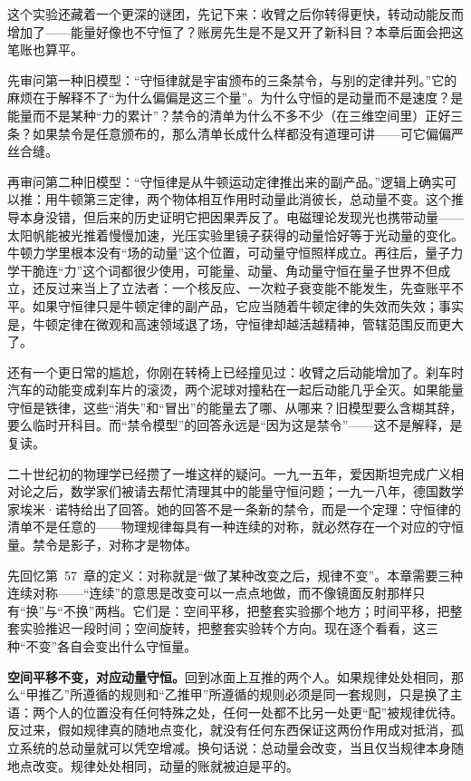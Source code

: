 这个实验还藏着一个更深的谜团，先记下来：收臂之后你转得更快，转动动能反而增加了——能量好像也不守恒了？账房先生是不是又开了新科目？本章后面会把这笔账也算平。


先审问第一种旧模型：“守恒律就是宇宙颁布的三条禁令，与别的定律并列。”它的麻烦在于解释不了“为什么偏偏是这三个量”。为什么守恒的是动量而不是速度？是能量而不是某种“力的累计”？禁令的清单为什么不多不少（在三维空间里）正好三条？如果禁令是任意颁布的，那么清单长成什么样都没有道理可讲——可它偏偏严丝合缝。

再审问第二种旧模型：“守恒律是从牛顿运动定律推出来的副产品。”逻辑上确实可以推：用牛顿第三定律，两个物体相互作用时动量此消彼长，总动量不变。这个推导本身没错，但后来的历史证明它把因果弄反了。电磁理论发现光也携带动量——太阳帆能被光推着慢慢加速，光压实验里镜子获得的动量恰好等于光动量的变化。牛顿力学里根本没有“场的动量”这个位置，可动量守恒照样成立。再往后，量子力学干脆连“力”这个词都很少使用，可能量、动量、角动量守恒在量子世界不但成立，还反过来当上了立法者：一个核反应、一次粒子衰变能不能发生，先查账平不平。如果守恒律只是牛顿定律的副产品，它应当随着牛顿定律的失效而失效；事实是，牛顿定律在微观和高速领域退了场，守恒律却越活越精神，管辖范围反而更大了。

还有一个更日常的尴尬，你刚在转椅上已经撞见过：收臂之后动能增加了。刹车时汽车的动能变成刹车片的滚烫，两个泥球对撞粘在一起后动能几乎全灭。如果能量守恒是铁律，这些“消失”和“冒出”的能量去了哪、从哪来？旧模型要么含糊其辞，要么临时开科目。而“禁令模型”的回答永远是“因为这是禁令”——这不是解释，是复读。

二十世纪初的物理学已经攒了一堆这样的疑问。一九一五年，爱因斯坦完成广义相对论之后，数学家们被请去帮忙清理其中的能量守恒问题；一九一八年，德国数学家埃米·诺特给出了回答。她的回答不是一条新的禁令，而是一个定理：守恒律的清单不是任意的——物理规律每具有一种连续的对称，就必然存在一个对应的守恒量。禁令是影子，对称才是物体。


先回忆第~57~章的定义：对称就是“做了某种改变之后，规律不变”。本章需要三种连续对称——“连续”的意思是改变可以一点点地做，而不像镜面反射那样只有“换”与“不换”两档。它们是：空间平移，把整套实验挪个地方；时间平移，把整套实验推迟一段时间；空间旋转，把整套实验转个方向。现在逐个看看，这三种“不变”各自会变出什么守恒量。

\textbf{空间平移不变，对应动量守恒。}回到冰面上互推的两个人。如果规律处处相同，那么“甲推乙”所遵循的规则和“乙推甲”所遵循的规则必须是同一套规则，只是换了主语：两个人的位置没有任何特殊之处，任何一处都不比另一处更“配”被规律优待。反过来，假如规律真的随地点变化，就没有任何东西保证这两份作用成对抵消，孤立系统的总动量就可以凭空增减。换句话说：总动量会改变，当且仅当规律本身随地点改变。规律处处相同，动量的账就被迫是平的。

